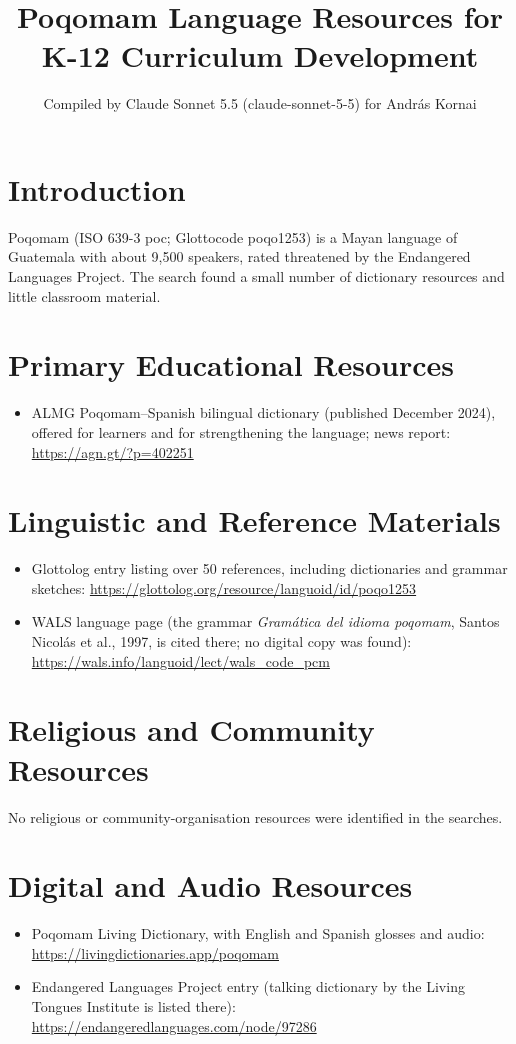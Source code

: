\documentclass[12pt]{article}
\title{Poqomam Language Resources for K-12 Curriculum Development}
\author{Compiled by Claude Sonnet 5.5 (claude-sonnet-5-5) for Andr\'as Kornai}
\date{}
\begin{document}
\maketitle

\section{Introduction}
Poqomam (ISO 639-3 poc; Glottocode poqo1253) is a Mayan language of Guatemala with about 9,500 speakers, rated threatened by the Endangered Languages Project. The search found a small number of dictionary resources and little classroom material.

\section{Primary Educational Resources}
\begin{itemize}
\item ALMG Poqomam--Spanish bilingual dictionary (published December 2024), offered for learners and for strengthening the language; news report: \url{https://agn.gt/?p=402251}
\end{itemize}

\section{Linguistic and Reference Materials}
\begin{itemize}
\item Glottolog entry listing over 50 references, including dictionaries and grammar sketches: \url{https://glottolog.org/resource/languoid/id/poqo1253}
\item WALS language page (the grammar \emph{Gram\'atica del idioma poqomam}, Santos Nicol\'as et al., 1997, is cited there; no digital copy was found): \url{https://wals.info/languoid/lect/wals_code_pcm}
\end{itemize}

\section{Religious and Community Resources}
No religious or community-organisation resources were identified in the searches.

\section{Digital and Audio Resources}
\begin{itemize}
\item Poqomam Living Dictionary, with English and Spanish glosses and audio: \url{https://livingdictionaries.app/poqomam}
\item Endangered Languages Project entry (talking dictionary by the Living Tongues Institute is listed there): \url{https://endangeredlanguages.com/node/97286}
\end{itemize}
\end{document}
